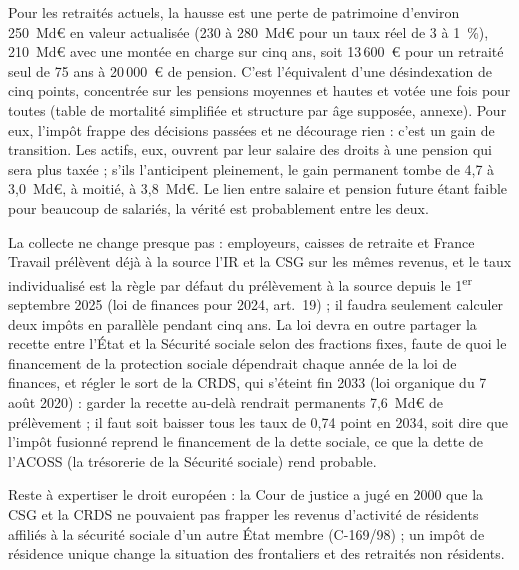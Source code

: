 
Pour les retraités actuels, la hausse est une perte de patrimoine d'environ 250~Md€ en valeur actualisée (230 à 280~Md€
pour un taux réel de 3 à 1~\%), 210~Md€ avec une montée en charge sur cinq ans, soit 13\,600~€ pour un retraité seul de
75 ans à 20\,000~€ de pension. C'est l'équivalent d'une désindexation de cinq points, concentrée sur les pensions
moyennes et hautes et votée une fois pour toutes (table de mortalité simplifiée et structure par âge supposée, annexe).
Pour eux, l'impôt frappe des décisions passées et ne décourage rien : c'est un gain de transition. Les actifs, eux,
ouvrent par leur salaire des droits à une pension qui sera plus taxée ; s'ils l'anticipent pleinement, le gain permanent
tombe de 4,7 à 3,0~Md€, à moitié, à 3,8~Md€. Le lien entre salaire et pension future étant faible pour beaucoup de
salariés, la vérité est probablement entre les deux.

La collecte ne change presque pas : employeurs, caisses de retraite et France Travail prélèvent déjà à la source l'IR et
la CSG sur les mêmes revenus, et le taux individualisé est la règle par défaut du prélèvement à la source depuis le
1\textsuperscript{er} septembre 2025 (loi de finances pour 2024, art.~19) ; il faudra seulement calculer deux impôts en
parallèle pendant cinq ans. La loi devra en outre partager la recette entre l'État et la Sécurité sociale
selon des fractions fixes, faute de quoi le financement de la protection sociale dépendrait chaque année de la loi de
finances, et régler le sort de la CRDS, qui s'éteint fin 2033 (loi organique du 7 août 2020) : garder la
recette au-delà rendrait permanents 7,6~Md€ de prélèvement ; il faut soit baisser tous les taux de 0,74 point en 2034,
soit dire que l'impôt fusionné reprend le financement de la dette sociale, ce que la dette de l'ACOSS (la trésorerie de
la Sécurité sociale) rend probable.

Reste à expertiser le droit européen : la Cour de justice a jugé en 2000 que la CSG et la CRDS ne pouvaient pas frapper
les revenus d'activité de résidents affiliés à la sécurité sociale d'un autre État membre (C-169/98) ; un impôt de
résidence unique change la situation des frontaliers et des retraités non résidents.
